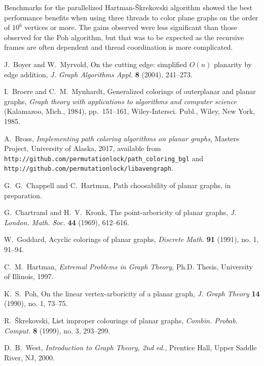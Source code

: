 \documentclass[12pt,letterpaper]{article}
\theoremstyle{plain}
\theoremstyle{definition}
\theoremstyle{break}
\begin{document}
Benchmarks for the parallelized Hartman-\v{S}krekovski algorithm showed
the best performance
benefits when using three threads to color plane graphs on the order
of $10^6$ vertices or more.
The gains observed were less significant than those observed for the
Poh algorithm, but that was to be expected as the recursive frames are often
dependent and thread coordination is more complicated.

\begin{thebibliography}{99}

J.~Boyer and W.~Myrvold, On the cutting edge: simplified $O(n)$ planarity by edge
addition,
\textit{J. Graph Algorithms Appl.}
\textbf{8} (2004),
241--273.

I.~Broere and C.~M.~Mynhardt,
Generalized colorings of outerplanar and planar graphs,
\textit{Graph theory with applications to algorithms and computer science}
 (Kalamazoo, Mich., 1984),
pp.~151--161,
Wiley-Intersci. Publ., Wiley, New York, 1985.

A.~Bross,
\textit{Implementing path coloring algorithms on planar graphs},
Masters Project,
University of Alaska,
2017,
available from\hfil\break
\texttt{http://github.com/permutationlock/path\_coloring\_bgl} and\hfil\break
\texttt{http://github.com/permutationlock/libavengraph}.

G.~G.~Chappell and C.~Hartman,
Path choosability of planar graphs,
in preparation.

G.~Chartrand and H.~V.~Kronk,
The point-arboricity of planar graphs,
\textit{J. London. Math. Soc.}
\textbf{44} (1969),
612--616.

W.~Goddard,
Acyclic colorings of planar graphs,
\textit{Discrete Math.}
\textbf{91} (1991), no. 1,
91--94.

C.~M.~Hartman,
\textit{Extremal Problems in Graph Theory},
Ph.D. Thesis,
University of Illinois,
1997.

K.~S.~Poh,
On the linear vertex-arboricity of a planar graph,
\textit{J. Graph Theory}
\textbf{14} (1990), no. 1,
73--75.

R.~\v{S}krekovski,
List improper colourings of planar graphs,
\textit{Combin. Probab. Comput.}
\textbf{8} (1999), no. 3,
293--299.

D.~B.~West,
\textit{Introduction to Graph Theory, 2nd ed.},
Prentice Hall,
Upper Saddle River, NJ,
2000.

\end{thebibliography}
\end{document}
